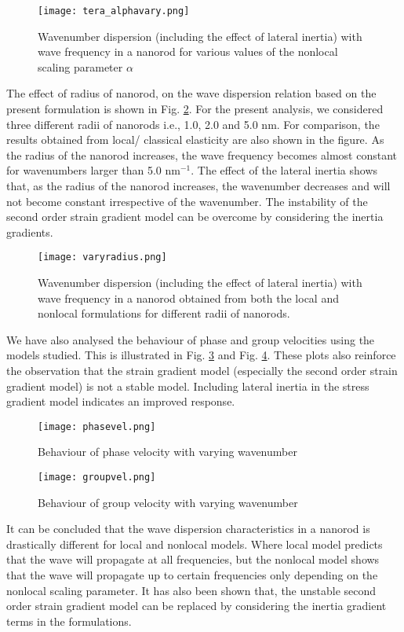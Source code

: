 \begin{figure}
\centering
\texttt{[image: tera\_alphavary.png]}
\caption{Wavenumber dispersion (including the effect of lateral inertia) with wave
frequency in a nanorod for various values of the nonlocal scaling parameter $\alpha$}
\label{varyalpha}
\end{figure}

The effect of radius of nanorod, on the wave dispersion relation
based on the present formulation is shown in Fig. \ref{varyradius}. For the present
analysis, we considered three different radii of nanorods i.e., 1.0,
2.0 and 5.0 nm. For comparison, the results obtained from local/
classical elasticity are also shown in the figure. As the radius of the
nanorod increases, the wave frequency becomes almost constant for
wavenumbers larger than 5.0 $\text{nm}^{-1}$. The effect of the lateral inertia
shows that, as the radius of the nanorod increases, the wavenumber
decreases and will not become constant irrespective of the wavenumber. The instability of the second order strain gradient
model can be overcome by considering the inertia gradients.

\begin{figure}
\centering
\texttt{[image: varyradius.png]}
\caption{Wavenumber dispersion (including the effect of lateral inertia) with wave
frequency in a nanorod obtained from both the local and nonlocal formulations for
different radii of nanorods.}
\label{varyradius}
\end{figure}

We have also analysed the behaviour of phase and group velocities using the models studied. This is illustrated in Fig. \ref{phasevel} and Fig. \ref{groupvel}. These plots also reinforce the observation that the strain gradient model (especially the second order strain gradient model) is not a stable model. Including lateral inertia in the stress gradient model indicates an improved response.

\begin{figure}
\centering
\texttt{[image: phasevel.png]}
\caption{Behaviour of phase velocity with varying wavenumber}
\label{phasevel}
\end{figure}

\begin{figure}
\centering
\texttt{[image: groupvel.png]}
\caption{Behaviour of group velocity with varying wavenumber}
\label{groupvel}
\end{figure}

It can be concluded that the wave dispersion characteristics in a
nanorod is drastically different for local and nonlocal models.
Where local model predicts that the wave will propagate at all
frequencies, but the nonlocal model shows that the wave will
propagate up to certain frequencies only depending on the nonlocal
scaling parameter. It has also been shown that, the unstable second
order strain gradient model can be replaced by considering the
inertia gradient terms in the formulations. 

